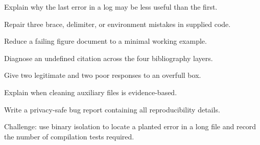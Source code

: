 \chapterexercisestitle
\begin{chapterexercises}
  \item Explain why the last error in a log may be less useful than the first.
  \item Repair three brace, delimiter, or environment mistakes in supplied code.
  \item Reduce a failing figure document to a minimal working example.
  \item Diagnose an undefined citation across the four bibliography layers.
  \item Give two legitimate and two poor responses to an overfull box.
  \item Explain when cleaning auxiliary files is evidence-based.
  \item Write a privacy-safe bug report containing all reproducibility details.
  \item Challenge: use binary isolation to locate a planted error in a long file
        and record the number of compilation tests required.
\end{chapterexercises}
